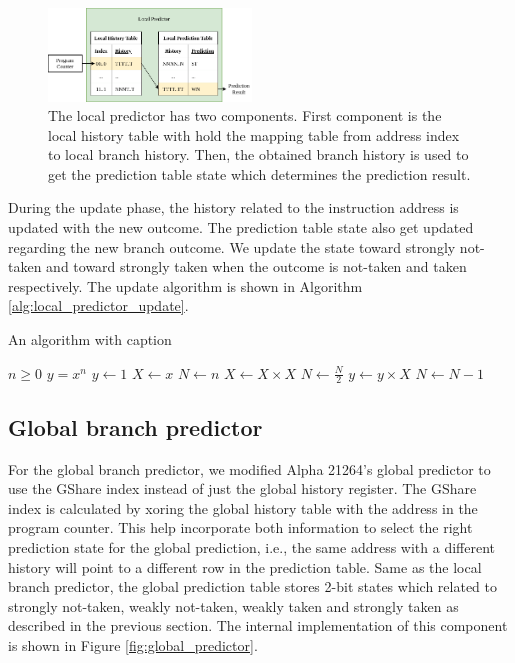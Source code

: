 \documentclass[conference]{IEEEtran}
\begin{document}
\begin{figure}[h]
    \centering
    \includegraphics[width=0.48\textwidth]{imgs/local_predictor}
    \caption{The local predictor has two components. First component is the local history table with
    hold the mapping table from address index to local branch history. Then, the obtained branch history
    is used to get the prediction table state which determines the prediction result.}
    \label{fig:local_predictor}
\end{figure}

During the update phase, the history related to the instruction address is updated with the new outcome.
The prediction table state also get updated regarding the new branch outcome. We update the state toward
strongly not-taken and toward strongly taken when the outcome is not-taken and taken respectively. The
update algorithm is shown in Algorithm \ref{alg:local_predictor_update}.

\begin{algorithm}
\caption{An algorithm with caption}\label{alg:local_predictor_update}
\begin{algorithmic}
\Require $n \geq 0$
\Ensure $y = x^n$
\State $y \gets 1$
\State $X \gets x$
\State $N \gets n$
    \State $X \gets X \times X$
    \State $N \gets \frac{N}{2}$  
    \State $y \gets y \times X$
    \State $N \gets N - 1$
\EndIf
\EndWhile
\end{algorithmic}
\end{algorithm}



\subsection{Global branch predictor}

For the global branch predictor, we modified Alpha 21264's global predictor to use the GShare index
instead of just the global history register. The GShare index is calculated by xoring the global history
table with the address in the program counter. This help incorporate both information to select the right
prediction state for the global prediction, i.e., the same address with a different history will point to a
different row in the prediction table. Same as the local branch predictor, the global prediction table stores
2-bit states which related to strongly not-taken, weakly not-taken, weakly taken and strongly taken as described
in the previous section. The internal implementation of this component is shown in Figure \ref{fig:global_predictor}.
\end{document}
